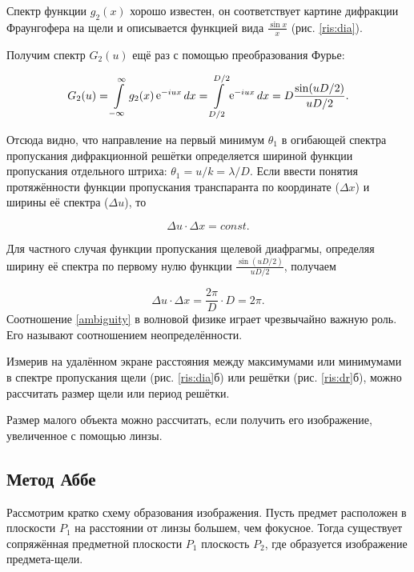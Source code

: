 \documentclass[a5paper,10pt, twoside]{article} %
\begin{document}
	
	Спектр функции $g_2(x)$ хорошо известен, он соответствует картине дифракции Фраунгофера на 
	щели и описывается функцией вида $\frac{\sin x}{x}$ (рис. \ref{ris:dia}).
	
	Получим спектр $G_2(u)$ ещё раз с помощью преобразования Фурье:
	
	\begin{displaymath}
		G_2(u) = \int\limits_{-\infty}^{\infty} g_2(x) \mathop{\mathrm e}\nolimits^{-iux} dx = \int\limits_{D / 2}^{D / 2} \mathop{\mathrm e}\nolimits^{-iux} dx = D \frac{\sin (uD / 2)}{uD / 2}.
	\end{displaymath}
	
	Отсюда видно, что направление на первый минимум $\theta_1$ в огибающей спектра пропускания 
	дифракционной решётки определяется шириной функции пропускания отдельного штриха: 
	$\theta_1 = u / k = \lambda / D$. Если ввести понятия протяжённости функции пропускания 
	транспаранта по координате ($\Delta x$) и ширины её спектра ($\Delta u$), то
	
	\begin{equation}\label{ambiguity}
		\Delta u \cdot \Delta x = const.
	\end{equation}
	
	Для частного случая функции пропускания щелевой диафрагмы, определяя ширину её спектра по 
	первому нулю функции $\frac{\sin (uD / 2)}{uD / 2}$, получаем
	
	\begin{displaymath}
	\Delta u \cdot \Delta x = \frac{2 \pi}{D} \cdot D = 2 \pi.
	\end{displaymath}
	Соотношение \eqref{ambiguity} в волновой физике играет чрезвычайно важную роль. Его называют 
	соотношением неопределённости.
	
	Измерив на удалённом экране расстояния между максимумами или минимумами в спектре пропускания 
	щели (рис. \ref{ris:dia}б) или решётки (рис. \ref{ris:dr}б), можно рассчитать размер щели или 
	период решётки.
	
	Размер малого объекта можно рассчитать, если получить его изображение, увеличенное с помощью 
	линзы.
	
\subsection{Метод Аббе}
	
	Рассмотрим кратко схему образования изображения. Пусть предмет расположен в плоскости $P_1$ 
	на расстоянии от линзы большем, чем фокусное. Тогда существует сопряжённая предметной 
	плоскости $P_1$ плоскость $P_2$, где образуется изображение предмета-щели.
	
\end{document}
